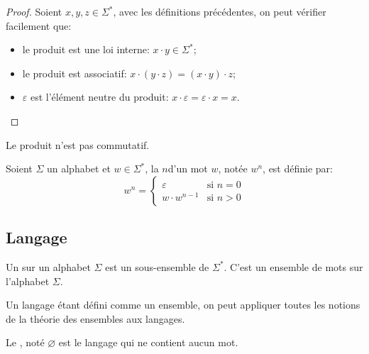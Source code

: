 \begin{proof}
	Soient \( x, y, z \in \Sigma^* \), avec les définitions précédentes, on peut vérifier facilement que:
	\begin{itemize}
		\item
		      le produit est une loi interne: $x \cdot y \in \Sigma^*$;
		\item
		      le produit est associatif: $x \cdot (y \cdot z) = (x \cdot y) \cdot z$;
		\item
		      $\varepsilon$ est l'élément neutre du produit: $x \cdot \varepsilon = \varepsilon \cdot x = x$.
	\end{itemize}
\end{proof}

Le produit n'est pas commutatif.

\begin{definition}
	Soient \( \Sigma \) un alphabet et \( w \in \Sigma^* \), la  \( n \)\ieme d'un mot \( w \), notée \( w^n \), est définie par:
	\[
		w^n =
		\begin{cases}
			\varepsilon     & \text{si $n = 0$} \\
			w \cdot w^{n-1} & \text{si $n > 0$}
		\end{cases}
	\]
\end{definition}


\subsection{Langage}

\begin{definition}
	Un  sur un alphabet \( \Sigma \) est un sous-ensemble de \( \Sigma^* \). C'est un ensemble de mots sur l'alphabet \( \Sigma \).
\end{definition}

Un langage étant défini comme un ensemble, on peut appliquer toutes les notions de la théorie des ensembles aux langages.

\begin{definition}
	Le , noté \( \varnothing \) est le langage qui ne contient aucun mot.
\end{definition}

